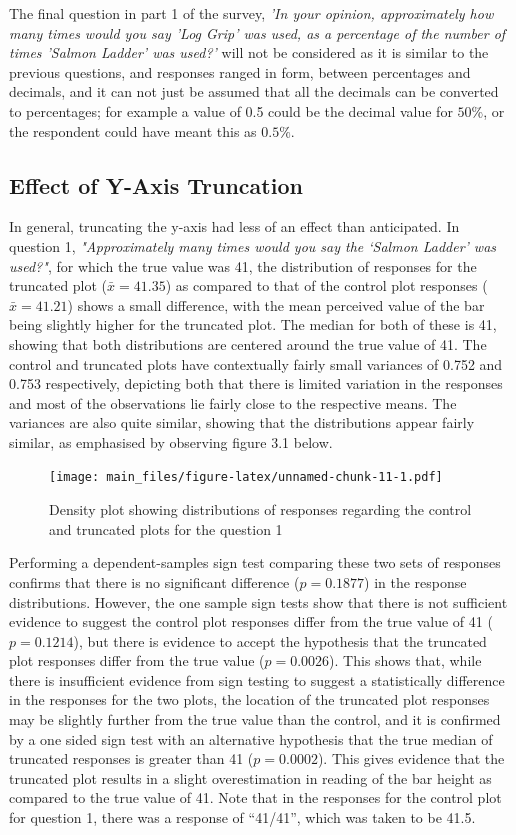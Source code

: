 \documentclass[
  11pt,
]{book}
\begin{document}
The final question in part 1 of the survey,
\textit{'In your opinion, approximately how many times would you say 'Log Grip' was used, as a percentage of the number of times 'Salmon Ladder' was used?'}
will not be considered as it is similar to the previous questions, and
responses ranged in form, between percentages and decimals, and it can
not just be assumed that all the decimals can be converted to
percentages; for example a value of 0.5 could be the decimal value for
\(50\%\), or the respondent could have meant this as \(0.5\%\).

\subsection{Effect of Y-Axis Truncation}

In general, truncating the y-axis had less of an effect than
anticipated. In question 1,
\textit{"Approximately many times would you say the ‘Salmon Ladder’ was used?"},
for which the true value was 41, the distribution of responses for the
truncated plot (\(\bar{x} = 41.35\)) as compared to that of the control
plot responses (\(\bar{x}=41.21\)) shows a small difference, with the
mean perceived value of the bar being slightly higher for the truncated
plot. The median for both of these is 41, showing that both
distributions are centered around the true value of 41. The control and
truncated plots have contextually fairly small variances of 0.752 and
0.753 respectively, depicting both that there is limited variation in
the responses and most of the observations lie fairly close to the
respective means. The variances are also quite similar, showing that the
distributions appear fairly similar, as emphasised by observing figure
3.1 below.

\begin{figure}
\centering
\texttt{[image: main\_files/figure-latex/unnamed-chunk-11-1.pdf]}
\caption{Density plot showing distributions of responses regarding the
control and truncated plots for the question 1}
\end{figure}

Performing a dependent-samples sign test comparing these two sets of
responses confirms that there is no significant difference
(\(p = 0.1877\)) in the response distributions. However, the one sample
sign tests show that there is not sufficient evidence to suggest the
control plot responses differ from the true value of 41
(\(p = 0.1214\)), but there is evidence to accept the hypothesis that
the truncated plot responses differ from the true value
(\(p = 0.0026\)). This shows that, while there is insufficient evidence
from sign testing to suggest a statistically difference in the responses
for the two plots, the location of the truncated plot responses may be
slightly further from the true value than the control, and it is
confirmed by a one sided sign test with an alternative hypothesis that
the true median of truncated responses is greater than 41
(\(p=0.0002\)). This gives evidence that the truncated plot results in a
slight overestimation in reading of the bar height as compared to the
true value of 41. Note that in the responses for the control plot for
question 1, there was a response of ``41/41'', which was taken to be
41.5.
\end{document}
